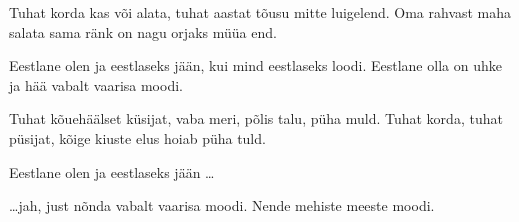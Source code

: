 Tuhat korda kas v\~oi alata,
tuhat aastat t\~ousu mitte luigelend.
Oma rahvast maha salata
sama r\"ank on nagu orjaks m\"u\"ua end.

Eestlane olen ja eestlaseks j\"a\"an,
kui mind eestlaseks loodi.
Eestlane olla on uhke ja h\"a\"a
vabalt vaarisa moodi.

Tuhat k\~oueh\"a\"alset k\"usijat,
vaba meri, p\~olis talu, p\"uha muld.
Tuhat korda, tuhat p\"usijat,
k\~oige kiuste elus hoiab p\"uha tuld.

Eestlane olen ja eestlaseks j\"a\"an \ldots

\ldots jah, just n\~onda vabalt vaarisa moodi.
Nende mehiste meeste moodi.